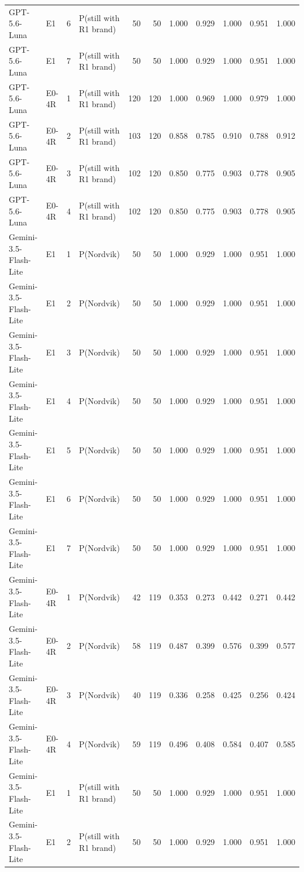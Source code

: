 \begin{table}[htbp]
\begin{tabular}{llrlrrrrrrr}
GPT-5.6-Luna & E1 & 6 & P(still with R1 brand) & 50 & 50 & 1.000 & 0.929 & 1.000 & 0.951 & 1.000 \\
GPT-5.6-Luna & E1 & 7 & P(still with R1 brand) & 50 & 50 & 1.000 & 0.929 & 1.000 & 0.951 & 1.000 \\
GPT-5.6-Luna & E0-4R & 1 & P(still with R1 brand) & 120 & 120 & 1.000 & 0.969 & 1.000 & 0.979 & 1.000 \\
GPT-5.6-Luna & E0-4R & 2 & P(still with R1 brand) & 103 & 120 & 0.858 & 0.785 & 0.910 & 0.788 & 0.912 \\
GPT-5.6-Luna & E0-4R & 3 & P(still with R1 brand) & 102 & 120 & 0.850 & 0.775 & 0.903 & 0.778 & 0.905 \\
GPT-5.6-Luna & E0-4R & 4 & P(still with R1 brand) & 102 & 120 & 0.850 & 0.775 & 0.903 & 0.778 & 0.905 \\
Gemini-3.5-Flash-Lite & E1 & 1 & P(Nordvik) & 50 & 50 & 1.000 & 0.929 & 1.000 & 0.951 & 1.000 \\
Gemini-3.5-Flash-Lite & E1 & 2 & P(Nordvik) & 50 & 50 & 1.000 & 0.929 & 1.000 & 0.951 & 1.000 \\
Gemini-3.5-Flash-Lite & E1 & 3 & P(Nordvik) & 50 & 50 & 1.000 & 0.929 & 1.000 & 0.951 & 1.000 \\
Gemini-3.5-Flash-Lite & E1 & 4 & P(Nordvik) & 50 & 50 & 1.000 & 0.929 & 1.000 & 0.951 & 1.000 \\
Gemini-3.5-Flash-Lite & E1 & 5 & P(Nordvik) & 50 & 50 & 1.000 & 0.929 & 1.000 & 0.951 & 1.000 \\
Gemini-3.5-Flash-Lite & E1 & 6 & P(Nordvik) & 50 & 50 & 1.000 & 0.929 & 1.000 & 0.951 & 1.000 \\
Gemini-3.5-Flash-Lite & E1 & 7 & P(Nordvik) & 50 & 50 & 1.000 & 0.929 & 1.000 & 0.951 & 1.000 \\
Gemini-3.5-Flash-Lite & E0-4R & 1 & P(Nordvik) & 42 & 119 & 0.353 & 0.273 & 0.442 & 0.271 & 0.442 \\
Gemini-3.5-Flash-Lite & E0-4R & 2 & P(Nordvik) & 58 & 119 & 0.487 & 0.399 & 0.576 & 0.399 & 0.577 \\
Gemini-3.5-Flash-Lite & E0-4R & 3 & P(Nordvik) & 40 & 119 & 0.336 & 0.258 & 0.425 & 0.256 & 0.424 \\
Gemini-3.5-Flash-Lite & E0-4R & 4 & P(Nordvik) & 59 & 119 & 0.496 & 0.408 & 0.584 & 0.407 & 0.585 \\
Gemini-3.5-Flash-Lite & E1 & 1 & P(still with R1 brand) & 50 & 50 & 1.000 & 0.929 & 1.000 & 0.951 & 1.000 \\
Gemini-3.5-Flash-Lite & E1 & 2 & P(still with R1 brand) & 50 & 50 & 1.000 & 0.929 & 1.000 & 0.951 & 1.000 \\

\end{tabular}
\end{table}
